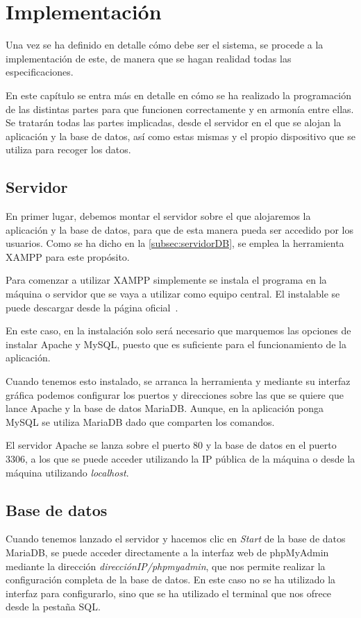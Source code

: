 \chapter{Implementación}
\label{ch:implementacion}
Una vez se ha definido en detalle cómo debe ser el sistema, se procede a la implementación de este, de manera que se hagan realidad todas las especificaciones. 

En este capítulo se entra más en detalle en cómo se ha realizado la programación de las distintas partes para que funcionen correctamente y en armonía entre ellas. Se tratarán todas las partes implicadas, desde el servidor en el que se alojan la aplicación y la base de datos, así como estas mismas y el propio dispositivo que se utiliza para recoger los datos.

\section{Servidor}\label{sec:servidorImpl}
En primer lugar, debemos montar el servidor sobre el que alojaremos la aplicación y la base de datos, para que de esta manera pueda ser accedido por los usuarios. Como se ha dicho en la \autoref{subsec:servidorDB}, se emplea la herramienta XAMPP para este propósito.

Para comenzar a utilizar XAMPP simplemente se instala el programa en la máquina o servidor que se vaya a utilizar como equipo central. El instalable se puede descargar desde la página oficial~\cite{vmware_xampp_nodate}.

En este caso, en la instalación solo será necesario que marquemos las opciones de instalar Apache y MySQL, puesto que es suficiente para el funcionamiento de la aplicación.

Cuando tenemos esto instalado, se arranca la herramienta y mediante su interfaz gráfica podemos configurar los puertos y direcciones sobre las que se quiere que lance Apache y la base de datos MariaDB. Aunque, en la aplicación ponga MySQL se utiliza MariaDB dado que comparten los comandos.

El servidor Apache se lanza sobre el puerto 80 y la base de datos en el puerto 3306, a los que se puede acceder utilizando la IP pública de la máquina o desde la máquina utilizando \textit{localhost}.

\section{Base de datos}\label{sec:base-de-datos}
Cuando tenemos lanzado el servidor y hacemos clic en \textit{Start} de la base de datos MariaDB, se puede acceder directamente a la interfaz web de phpMyAdmin mediante la dirección \textit{direcciónIP/phpmyadmin}, que nos permite realizar la configuración completa de la base de datos. En este caso no se ha utilizado la interfaz para configurarlo, sino que se ha utilizado el terminal que nos ofrece desde la pestaña SQL\@.
\pagebreak

